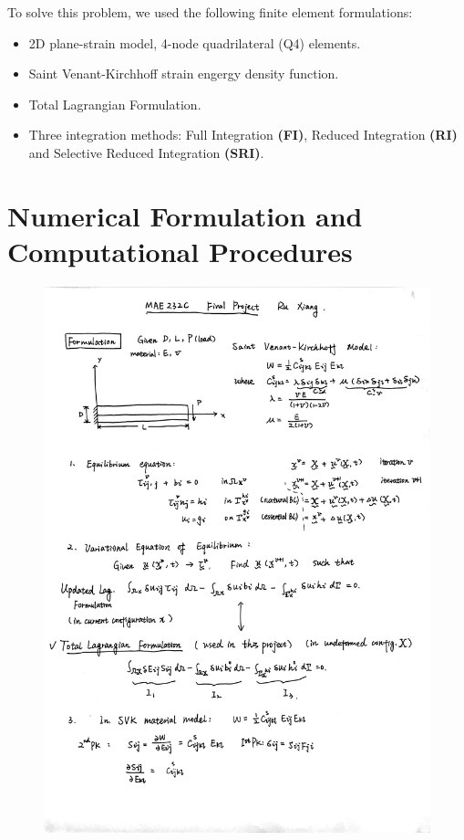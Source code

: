 \documentclass{article}
\begin{document}
\vspace*{1.5em}
  To solve this problem, we used the following finite element formulations:
  
 \begin{itemize}
 \item 2D plane-strain model, 4-node quadrilateral (Q4) elements.
 \item Saint Venant-Kirchhoff strain engergy density function.
 \item Total Lagrangian Formulation.
 \item Three integration methods: Full Integration \textbf{(FI)}, Reduced Integration \textbf{(RI)} and Selective Reduced Integration \textbf{(SRI)}.
 \end{itemize}

\vspace*{1.5em}


\section{Numerical Formulation and Computational Procedures}

 \begin{figure}[H]
	\centering
	\includegraphics[scale=0.2]{MAE232C_FINAL_PROJECT_latex/formulation_1.jpg}
\end{figure}
\end{document}
